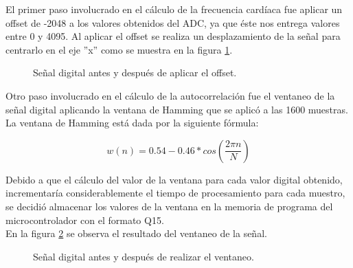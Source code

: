 El primer paso involucrado en el cálculo de la frecuencia cardíaca fue aplicar un offset de -2048 a los valores obtenidos del ADC, ya que éste nos entrega valores entre 0 y 4095. Al aplicar el offset se realiza un desplazamiento de la señal para centrarlo en el eje ''x'' como se muestra en la figura \ref{fig:offset}. \\

\begin{figure}[htbp!]
	\centering
	\caption{Señal digital antes y después de aplicar el offset.}
	\label{fig:offset}
\end{figure}

Otro paso involucrado en el cálculo de la autocorrelación fue el ventaneo de la señal digital aplicando la ventana de Hamming que se aplicó a las 1600 muestras. La ventana de Hamming está dada por la siguiente fórmula: 

$$w(n) = 0.54 - 0.46 * cos(\frac{2\pi n}{N})$$

Debido a que el cálculo del valor de la ventana para cada valor digital obtenido, incrementaría considerablemente el tiempo de procesamiento para cada muestro, se decidió almacenar los valores de la ventana en la memoria de programa del microcontrolador con el formato Q15. \\

En la figura \ref{fig:ventaneo} se observa el resultado del ventaneo de la señal. \\

\begin{figure}[htbp!]
	\centering
	\caption{Señal digital antes y después de realizar el ventaneo.}
	\label{fig:ventaneo}
\end{figure}

